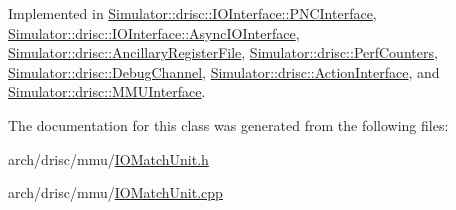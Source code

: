 Implemented in \hyperlink{class_simulator_1_1drisc_1_1_i_o_interface_1_1_p_n_c_interface_a9dca9fcd96b2988c7004eee51924cbb1}{Simulator\+::drisc\+::\+I\+O\+Interface\+::\+P\+N\+C\+Interface}, \hyperlink{class_simulator_1_1drisc_1_1_i_o_interface_1_1_async_i_o_interface_aadb2d48c24ed209ee89b5306f49afdb1}{Simulator\+::drisc\+::\+I\+O\+Interface\+::\+Async\+I\+O\+Interface}, \hyperlink{class_simulator_1_1drisc_1_1_ancillary_register_file_a18868afcd222db4d23133218919bf822}{Simulator\+::drisc\+::\+Ancillary\+Register\+File}, \hyperlink{class_simulator_1_1drisc_1_1_perf_counters_ab99dac8f3343e17eb960ecf478974ad9}{Simulator\+::drisc\+::\+Perf\+Counters}, \hyperlink{class_simulator_1_1drisc_1_1_debug_channel_aea26d20ae29dcf23154ef4072a108bfe}{Simulator\+::drisc\+::\+Debug\+Channel}, \hyperlink{class_simulator_1_1drisc_1_1_action_interface_a31669c050dea3f850808553054a093b5}{Simulator\+::drisc\+::\+Action\+Interface}, and \hyperlink{class_simulator_1_1drisc_1_1_m_m_u_interface_a8a85bcdf081e404d1803c12602e98859}{Simulator\+::drisc\+::\+M\+M\+U\+Interface}.



The documentation for this class was generated from the following files\+:\begin{DoxyCompactItemize}
\item 
arch/drisc/mmu/\hyperlink{_i_o_match_unit_8h}{I\+O\+Match\+Unit.\+h}\item 
arch/drisc/mmu/\hyperlink{_i_o_match_unit_8cpp}{I\+O\+Match\+Unit.\+cpp}\end{DoxyCompactItemize}
